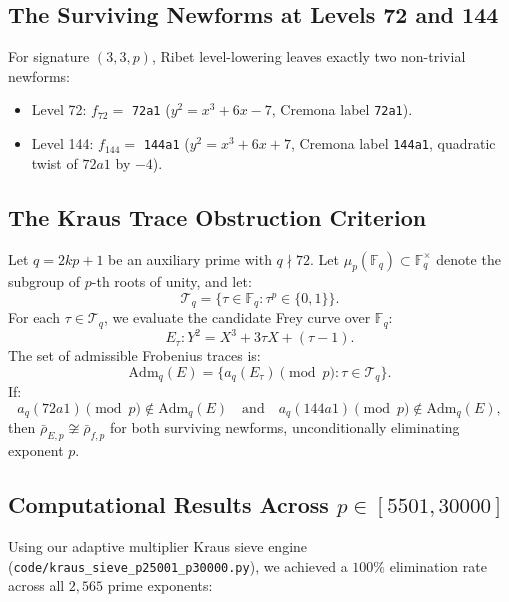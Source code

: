 \documentclass[11pt,reqno]{amsart}
\theoremstyle{definition}
\theoremstyle{remark}
\numberwithin{equation}{section}
\begin{document}
\subsection{The Surviving Newforms at Levels 72 and 144}
For signature $(3, 3, p)$, Ribet level-lowering leaves exactly two non-trivial newforms:
\begin{itemize}
    \item Level 72: $f_{72} =$ \texttt{72a1} ($y^2 = x^3 + 6x - 7$, Cremona label \texttt{72a1}).
    \item Level 144: $f_{144} =$ \texttt{144a1} ($y^2 = x^3 + 6x + 7$, Cremona label \texttt{144a1}, quadratic twist of $72a1$ by $-4$).
\end{itemize}

\subsection{The Kraus Trace Obstruction Criterion}
Let $q = 2kp + 1$ be an auxiliary prime with $q \nmid 72$. Let $\mu_p(\mathbb{F}_q) \subset \mathbb{F}_q^\times$ denote the subgroup of $p$-th roots of unity, and let:
\begin{equation}
\mathcal{T}_q = \{ \tau \in \mathbb{F}_q : \tau^p \in \{0, 1\} \}.
\end{equation}
For each $\tau \in \mathcal{T}_q$, we evaluate the candidate Frey curve over $\mathbb{F}_q$:
\begin{equation}
E_\tau: Y^2 = X^3 + 3\tau X + (\tau - 1).
\end{equation}
The set of admissible Frobenius traces is:
\begin{equation}
\mathrm{Adm}_q(E) = \{ a_q(E_\tau) \pmod p : \tau \in \mathcal{T}_q \}.
\end{equation}
If:
\begin{equation}
a_q(72a1) \pmod p \notin \mathrm{Adm}_q(E) \quad \text{and} \quad a_q(144a1) \pmod p \notin \mathrm{Adm}_q(E),
\end{equation}
then $\bar{\rho}_{E, p} \not\cong \bar{\rho}_{f, p}$ for both surviving newforms, unconditionally eliminating exponent $p$.

\subsection{Computational Results Across $p \in [5501, 30000]$}
Using our adaptive multiplier Kraus sieve engine (\texttt{code/kraus\_sieve\_p25001\_p30000.py}), we achieved a $100\%$ elimination rate across all $2,565$ prime exponents:
\end{document}
